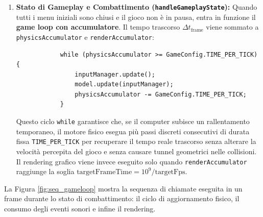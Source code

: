 \documentclass[11pt, a4paper]{article}
\begin{document}
\begin{enumerate}
		\item \textbf{Stato di Gameplay e Combattimento (\texttt{handleGameplayState}):} Quando tutti i menu iniziali sono chiusi e il gioco non è in pausa, entra in funzione il \textbf{game loop con accumulatore}. Il tempo trascorso $\Delta t_{\text{frame}}$ viene sommato a \texttt{physicsAccumulator} e \texttt{renderAccumulator}:
		\begin{verbatim}
			while (physicsAccumulator >= GameConfig.TIME_PER_TICK) {
				inputManager.update();
				model.update(inputManager);
				physicsAccumulator -= GameConfig.TIME_PER_TICK;
			}
		\end{verbatim}
		Questo ciclo \texttt{while} garantisce che, se il computer subisce un rallentamento temporaneo, il motore fisico esegua più passi discreti consecutivi di durata fissa \texttt{TIME\_PER\_TICK} per recuperare il tempo reale trascorso senza alterare la velocità percepita del gioco e senza causare tunnel geometrici nelle collisioni. Il rendering grafico viene invece eseguito solo quando \texttt{renderAccumulator} raggiunge la soglia $\text{targetFrameTime} = 10^9 / \text{targetFps}$.
	\end{enumerate}
	
	La Figura \ref{fig:seq_gameloop} mostra la sequenza di chiamate eseguita in un frame durante lo stato di combattimento: il ciclo di aggiornamento fisico, il consumo degli eventi sonori e infine il rendering.
	
\end{document}
